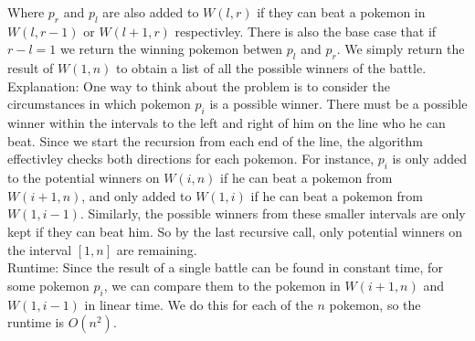 \documentclass{article}
\begin{document}
Where $p_r$ and $p_l$ are also added to $W(l, r)$ if they can beat a pokemon in $W(l, r - 1)$ or $W(l + 1, r)$ respectivley. There is also the base case that if $r - l = 1$ we return the winning pokemon betwen $p_l$ and $p_r$. We simply return the result of $W(1, n)$ to obtain a list of all the possible winners of the battle. \\[0.5ex]
Explanation: One way to think about the problem is to consider the circumstances in which pokemon $p_i$ is a possible winner. There must be a possible winner within the intervals to the left and right of him on the line who he can beat. Since we start the recursion from each end of the line, the algorithm effectivley checks both directions for each pokemon. For instance, $p_i$ is only added to the potential winners on $W(i, n)$ if he can beat a pokemon from $W(i + 1, n)$, and only added to $W(1, i)$ if he can beat a pokemon from $W(1, i - 1)$. Similarly, the possible winners from these smaller intervals are only kept if they can beat him. So by the last recursive call, only potential winners on the interval $[1, n]$ are remaining.  \\[0.5ex]
Runtime: Since the result of a single battle can be found in constant time, for some pokemon $p_i$, we can compare them to the pokemon in $W(i + 1, n)$ and $W(1, i - 1)$ in linear time. We do this for each of the $n$ pokemon, so the runtime is $O(n^2)$.

    
\end{document}

